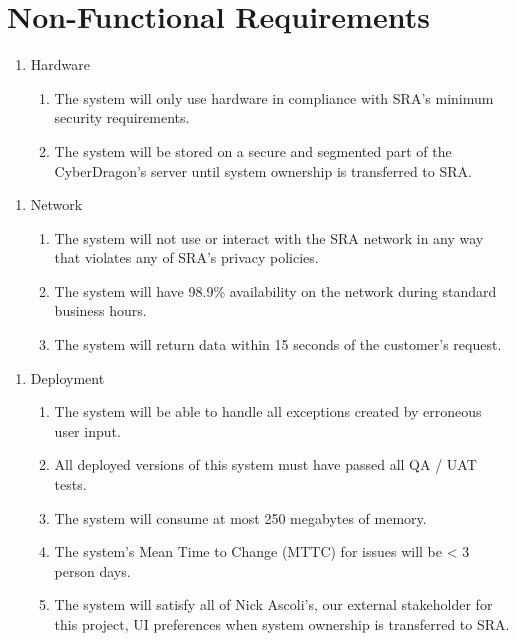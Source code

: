 \documentclass{scrreprt}
\begin{document}
\section{Non-Functional Requirements}

\begin{enumerate}[label*=N\arabic*.]
    \item Hardware
    \begin{enumerate}[label*=\arabic*.]
\item The system will only use hardware in compliance with SRA’s minimum security requirements. 
\item The system will be stored on a secure and segmented part of the CyberDragon’s server until system ownership is transferred to SRA.
    \end{enumerate}
\end{enumerate}

\begin{enumerate}[label*=N\arabic*.]
    \item Network
    \begin{enumerate}[label*=\arabic*.]
\item The system will not use or interact with the SRA network in any way that violates any of SRA’s privacy policies. 
\item The system will have 98.9\% availability on the network during standard business hours.
\item The system will return data within 15 seconds of the customer’s request. 

    \end{enumerate}
\end{enumerate}

\begin{enumerate}[label*=N\arabic*.]
    \item Deployment
    \begin{enumerate}[label*=\arabic*.]
\item The system will be able to handle all exceptions created by erroneous user input. 
\item All deployed versions of this system must have passed all QA / UAT tests.
\item The system will consume at most 250 megabytes of memory.
\item The system’s Mean Time to Change (MTTC) for issues will be < 3 person days. 
\item The system will satisfy all of Nick Ascoli’s, our external stakeholder for this project, UI preferences when system ownership is transferred to SRA.


    \end{enumerate}
\end{enumerate}
\end{document}
